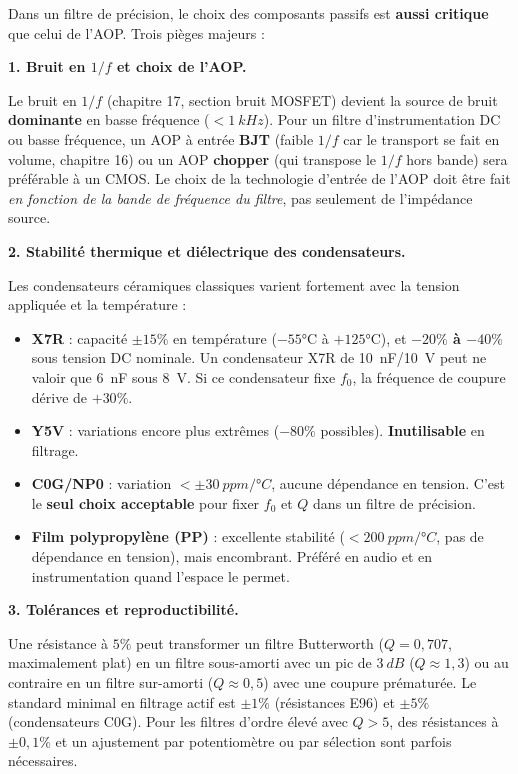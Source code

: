 \documentclass[12pt,a4paper,twoside]{book}
\begin{document}
\begin{attention}
Dans un filtre de précision, le choix des composants passifs est \textbf{aussi critique} que celui de l'AOP. Trois pièges majeurs :

\textbf{1. Bruit en $1/f$ et choix de l'AOP.}

Le bruit en $1/f$ (chapitre 17, section bruit MOSFET) devient la source de bruit \textbf{dominante} en basse fréquence ($< \SI{1}{kHz}$). Pour un filtre d'instrumentation DC ou basse fréquence, un AOP à entrée \textbf{BJT} (faible $1/f$ car le transport se fait en volume, chapitre 16) ou un AOP \textbf{chopper} (qui transpose le $1/f$ hors bande) sera préférable à un CMOS. Le choix de la technologie d'entrée de l'AOP doit être fait \textit{en fonction de la bande de fréquence du filtre}, pas seulement de l'impédance source.

\textbf{2. Stabilité thermique et diélectrique des condensateurs.}

Les condensateurs céramiques classiques varient fortement avec la tension appliquée et la température :
\begin{itemize}[nosep]
\item \textbf{X7R} : capacité $\pm 15\%$ en température ($-55°$C à $+125°$C), et \textbf{$-20\%$ à $-40\%$} sous tension DC nominale. Un condensateur X7R de \SI{10}{nF}/\SI{10}{V} peut ne valoir que \SI{6}{nF} sous \SI{8}{V}. Si ce condensateur fixe $f_0$, la fréquence de coupure dérive de $+30\%$.
\item \textbf{Y5V} : variations encore plus extrêmes ($-80\%$ possibles). \textbf{Inutilisable} en filtrage.
\item \textbf{C0G/NP0} : variation $< \pm\SI{30}{ppm/°C}$, aucune dépendance en tension. C'est le \textbf{seul choix acceptable} pour fixer $f_0$ et $Q$ dans un filtre de précision.
\item \textbf{Film polypropylène (PP)} : excellente stabilité ($< \SI{200}{ppm/°C}$, pas de dépendance en tension), mais encombrant. Préféré en audio et en instrumentation quand l'espace le permet.
\end{itemize}

\textbf{3. Tolérances et reproductibilité.}

Une résistance à $5\%$ peut transformer un filtre Butterworth ($Q = 0{,}707$, maximalement plat) en un filtre sous-amorti avec un pic de $\SI{3}{dB}$ ($Q \approx 1{,}3$) ou au contraire en un filtre sur-amorti ($Q \approx 0{,}5$) avec une coupure prématurée. Le standard minimal en filtrage actif est $\pm 1\%$ (résistances E96) et $\pm 5\%$ (condensateurs C0G). Pour les filtres d'ordre élevé avec $Q > 5$, des résistances à $\pm 0{,}1\%$ et un ajustement par potentiomètre ou par sélection sont parfois nécessaires.
\end{attention}
\end{document}

